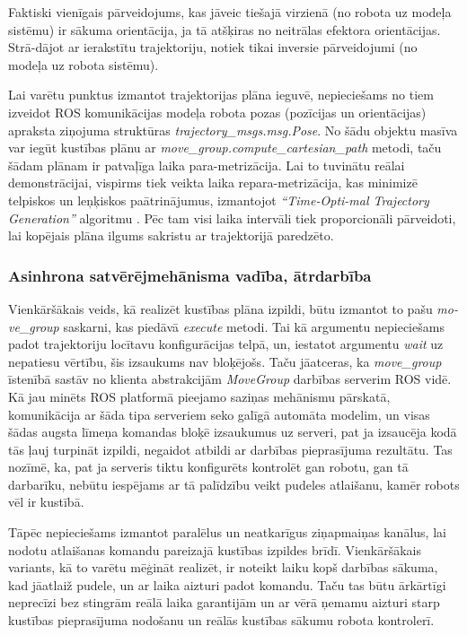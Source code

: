 \documentclass[12pt, a4paper]{article}
\numberwithin{equation}{section} %
\begin{document}
Faktiski vienīgais pārveidojums, kas jāveic tiešajā virzienā (no robota uz modeļa sistēmu) ir sākuma orientācija, ja tā atšķiras no neitrālas efektora orientācijas. Strā-dājot ar ierakstītu trajektoriju, notiek tikai inversie pārveidojumi (no modeļa uz robota sistēmu).

Lai varētu punktus izmantot trajektorijas plāna ieguvē, nepieciešams no tiem izveidot ROS komunikācijas modeļa robota pozas (pozīcijas un orientācijas) apraksta ziņojuma struktūras \textit{trajectory\_msgs.msg.Pose}. No šādu objektu masīva var iegūt kustības plānu ar \textit{move\_group.compute\_cartesian\_path} metodi, taču šādam plānam ir patvaļīga laika para-metrizācija. Lai to tuvinātu reālai demonstrācijai, vispirms tiek veikta laika repara-metrizācija, kas minimizē telpiskos un leņķiskos paātrinājumus, izmantojot \textit{``Time-Opti-mal Trajectory Generation''} algoritmu \cite{kunz2012time}. Pēc tam visi laika intervāli tiek proporcionāli pārveidoti, lai kopējais plāna ilgums sakristu ar trajektorijā paredzēto.

\subsubsection{Asinhrona satvērējmehānisma vadība, ātrdarbība}

Vienkāršākais veids, kā realizēt kustības plāna izpildi, būtu izmantot to pašu \textit{mo-ve\_group} saskarni, kas piedāvā \textit{execute} metodi. Tai kā argumentu nepieciešams padot trajektoriju locītavu konfigurācijas telpā, un, iestatot argumentu \textit{wait} uz nepatiesu vērtību, šis izsaukums nav bloķējošs. Taču jāatceras, ka \textit{move\_group} īstenībā sastāv no klienta abstrakcijām \textit{MoveGroup} darbības serverim ROS vidē. Kā jau minēts ROS platformā pieejamo saziņas mehānismu pārskatā, komunikācija ar šāda tipa serveriem seko galīgā automāta modelim, un visas šādas augsta līmeņa komandas bloķē izsaukumus uz serveri, pat ja izsaucēja kodā tās ļauj turpināt izpildi, negaidot atbildi ar darbības pieprasījuma rezultātu. Tas nozīmē, ka, pat ja serveris tiktu konfigurēts kontrolēt gan robotu, gan tā darbarīku, nebūtu iespējams ar tā palīdzību veikt pudeles atlaišanu, kamēr robots vēl ir kustībā.

Tāpēc nepieciešams izmantot paralēlus un neatkarīgus ziņapmaiņas kanālus, lai nodotu atlaišanas komandu pareizajā kustības izpildes brīdī. Vienkāršākais variants, kā to varētu mēģināt realizēt, ir noteikt laiku kopš darbības sākuma, kad jāatlaiž pudele, un ar laika aizturi padot komandu. Taču tas būtu ārkārtīgi neprecīzi bez stingrām reālā laika garantijām un ar vērā ņemamu aizturi starp kustības pieprasījuma nodošanu un reālās kustības sākumu robota kontrolerī.
\end{document}
